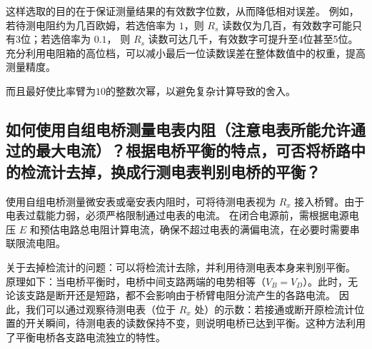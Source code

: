 \documentclass{../template/Report}%
\begin{document}
\begin{fullreportonly}
    这样选取的目的在于保证测量结果的有效数字位数，从而降低相对误差。
    例如，若待测电阻约为几百欧姆，若选倍率为 $1$，则 $R_s$ 读数仅为几百，有效数字可能只有3位；若选倍率为 $0.1$，
    则 $R_s$ 读数可达几千，有效数字可提升至4位甚至5位。充分利用电阻箱的高位档，可以减小最后一位读数误差在整体数值中的权重，提高测量精度。

    而且最好使比率臂为$10$的整数次幂，以避免复杂计算导致的舍入。

    \subsection{如何使用自组电桥测量电表内阻（注意电表所能允许通过的最大电流）？根据电桥平衡的特点，可否将桥路中的检流计去掉，换成行测电表判别电桥的平衡？}

    使用自组电桥测量微安表或毫安表内阻时，可将待测电表视为 $R_x$ 接入桥臂。由于电表过载能力弱，必须严格限制通过电表的电流。
    在闭合电源前，需根据电源电压 $E$ 和预估电路总电阻计算电流，确保不超过电表的满偏电流，在必要时需要串联限流电阻。

    关于去掉检流计的问题：可以将检流计去除，并利用待测电表本身来判别平衡。
    原理如下：当电桥平衡时，电桥中间支路两端的电势相等（$V_B = V_D$）。此时，无论该支路是断开还是短路，都不会影响由于桥臂电阻分流产生的各路电流。
    因此，我们可以通过观察待测电表（位于 $R_x$ 处）的示数：若接通或断开原检流计位置的开关瞬间，待测电表的读数保持不变，则说明电桥已达到平衡。这种方法利用了平衡电桥各支路电流独立的特性。
\end{fullreportonly}
\insertnotes
\end{document}
